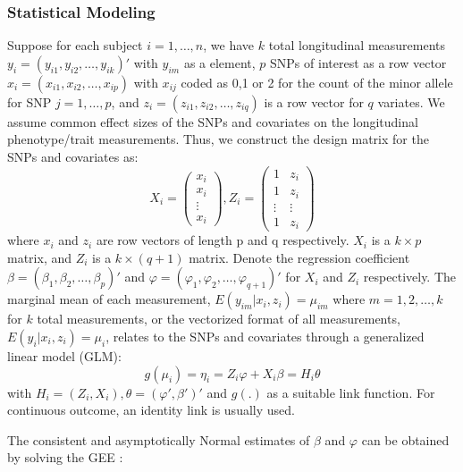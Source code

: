 \documentclass[12pt]{article}
\begin{document}
\subsubsection{Statistical Modeling}\label{sec:subsub1-1}
Suppose for each subject $i = 1,\ldots,n$, we have $k$ total longitudinal measurements $y_i = (y_{i1}, y_{i2}, \ldots, y_{ik})'$ with $y_{im}$ as a element, $p$ SNPs of interest as a row vector $x_i = (x_{i1}, x_{i2}, \ldots, x_{ip})$ with $x_{ij}$ coded as 0,1 or 2 for the count of the minor allele for SNP $j = 1, \ldots, p$, and $z_i = (z_{i1}, z_{i2}, \ldots, z_{iq})$ is a row vector for $q$ variates. We assume common effect sizes of the SNPs and covariates on the longitudinal phenotype/trait measurements. Thus, we construct the design matrix for the SNPs and covariates as:
$$
  X_i = \begin{pmatrix}
          x_{i}\\
          x_{i}\\
          \vdots\\
          x_{i}
          \end{pmatrix} 
  , 
  Z_{i}=\begin{pmatrix}1 & z_{i}\\
          1 & z_{i}\\
          \vdots & \vdots\\
          1 & z_{i}
          \end{pmatrix}
$$
where $x_i$ and $z_i$ are row vectors of length p and q respectively. $X_i$ is a $k \times p$ matrix, and $Z_{i}$ is a $k \times (q+1)$ matrix. Denote the regression coefficient $\beta = (\beta_1, \beta_2, \ldots, \beta_p)'$ and $\varphi = (\varphi_1, \varphi_2, \ldots, \varphi_{q+1})'$ for $X_i$ and $Z_i$ respectively. The marginal mean of each measurement, $E(y_{im}|x_i,z_i) = \mu_{im}$ where $m = 1,2, \ldots, k$ for $k$ total measurements, or the vectorized format of all measurements, $E(y_{i}|x_i,z_i) = \mu_{i}$, relates to the SNPs and covariates through a generalized linear model (GLM):
$$
g(\mu_i) = \eta_i = Z_i \varphi + X_i \beta = H_i \theta
$$
\noindent with $H_i = (Z_i, X_i), \theta = (\varphi', \beta')'$ and $g(.)$ as a suitable link function. For continuous outcome, an identity link is usually used.

The consistent and asymptotically Normal estimates of $\beta$ and $\varphi$ can be obtained by solving the GEE \cite{liang1986longitudinal}: 
\end{document}
